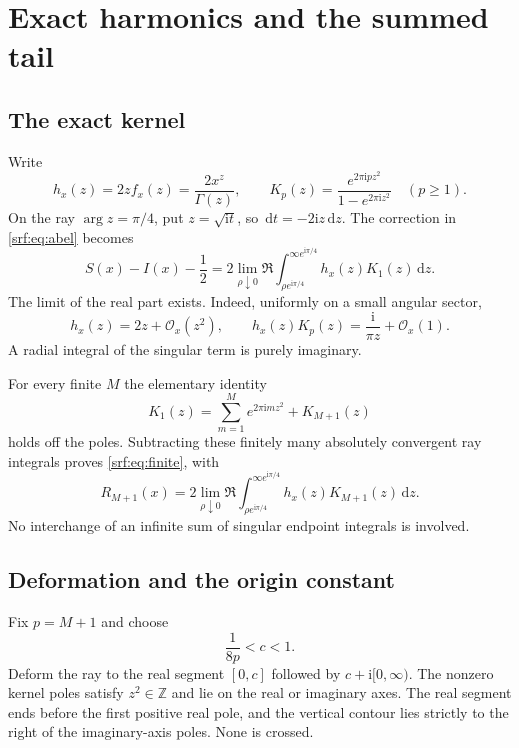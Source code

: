 \documentclass[11pt]{article}
\theoremstyle{remark}\newtheorem{remark}[theorem]{Remark}
\newcommand{\OO}{\mathcal O}
\newcommand{\ii}{\mathrm i}
\newcommand{\dd}{\,\mathrm d}
\begin{document}
\section{Exact harmonics and the summed tail}\label{srf:sec:tail}
\subsection{The exact kernel}
Write
\begin{equation}\label{srf:eq:hK}
 h_x(z)=2z f_x(z)=\frac{2x^z}{\Gamma(z)},\qquad
 K_p(z)=\frac{e^{2\pi\ii pz^2}}{1-e^{2\pi\ii z^2}}\quad(p\ge1).
\end{equation}
On the ray $\arg z=\pi/4$, put $z=\sqrt{\ii t}$, so $\dd t=-2\ii z\dd z$. The correction in \eqref{srf:eq:abel} becomes
\begin{equation}\label{srf:eq:rayidentity}
 S(x)-I(x)-\frac12
 =2\lim_{\rho\downarrow0}\Re
    \int_{\rho e^{\ii\pi/4}}^{\infty e^{\ii\pi/4}}
           h_x(z)K_1(z)\dd z.
\end{equation}
The limit of the real part exists. Indeed, uniformly on a small angular sector,
\begin{equation}\label{srf:eq:singular}
 h_x(z)=2z+\OO_x(z^2),\qquad
 h_x(z)K_p(z)=\frac{\ii}{\pi z}+\OO_x(1).
\end{equation}
A radial integral of the singular term is purely imaginary.

For every finite $M$ the elementary identity
\begin{equation}\label{srf:eq:geometric}
 K_1(z)=\sum_{m=1}^M e^{2\pi\ii mz^2}+K_{M+1}(z)
\end{equation}
holds off the poles. Subtracting these finitely many absolutely convergent ray integrals proves \eqref{srf:eq:finite}, with
\begin{equation}\label{srf:eq:Rexact}
 R_{M+1}(x)=2\lim_{\rho\downarrow0}\Re
 \int_{\rho e^{\ii\pi/4}}^{\infty e^{\ii\pi/4}}
                 h_x(z)K_{M+1}(z)\dd z.
\end{equation}
No interchange of an infinite sum of singular endpoint integrals is involved.

\subsection{Deformation and the origin constant}
Fix $p=M+1$ and choose
\begin{equation}\label{srf:eq:cchoice}
 \frac1{8p}<c<1.
\end{equation}
Deform the ray to the real segment $[0,c]$ followed by $c+\ii[0,\infty)$. The nonzero kernel poles satisfy $z^2\in\mathbb Z$ and lie on the real or imaginary axes. The real segment ends before the first positive real pole, and the vertical contour lies strictly to the right of the imaginary-axis poles. None is crossed.
\end{document}
